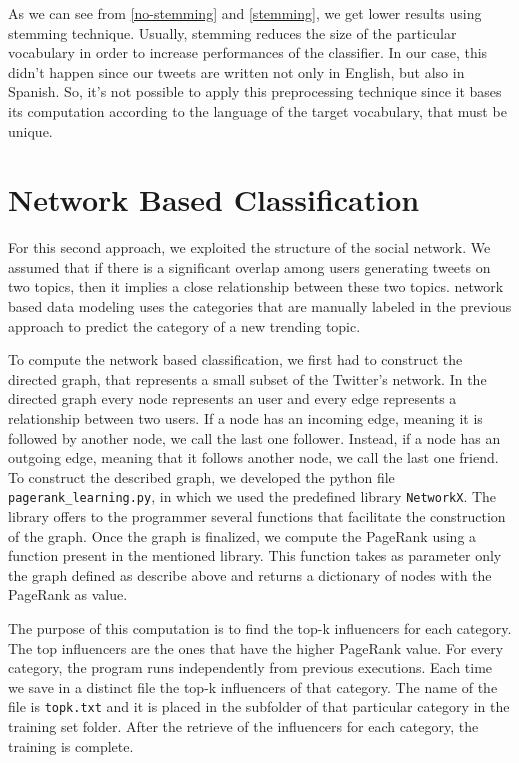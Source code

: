 \documentclass[journal,11pt]{vgtc}
\begin{document}
As we can see from \ref{no-stemming} and \ref{stemming}, we get lower results using stemming technique. Usually, stemming reduces the size of the particular vocabulary in order to increase performances of the classifier. In our case, this didn't happen since our tweets are written not only in English, but also in Spanish. So, it's not possible to apply this preprocessing technique since it bases its computation according to the language of the target vocabulary, that must be unique.

\newpage
\section{Network Based Classification}
For this second approach, we exploited the structure of the social network. We assumed that if there is a significant overlap among users
generating tweets on two topics, then it implies a close relationship between these two topics.
network based data modeling uses the categories that are manually labeled in the previous approach to predict
the category of a new trending topic.

To compute the network based classification, we first had to construct the directed graph, that represents a small
subset of the Twitter's network.
In the directed graph every node represents an user and every edge represents a relationship between two users.
If a node has an incoming edge, meaning it is followed by another node, we call the last one follower. Instead, if a node has an
outgoing edge, meaning that it follows another node, we call the last one friend.
To construct the described graph, we developed the python file \texttt{pagerank\_learning.py}, in which we used the predefined library \texttt{NetworkX}. The library offers to the programmer
several functions that facilitate the construction of the graph.
Once the graph is finalized, we compute the PageRank using a function present in the mentioned library.
This function takes as parameter only the graph defined as describe above and returns a dictionary of nodes
with the PageRank as value.

The purpose of this computation is to find the top-k influencers for each category. The top influencers
are the ones that have the higher PageRank value.
For every category, the program runs independently from previous executions. Each time we save in a
distinct file the top-k influencers of that category. The name of the file is
\texttt{topk.txt} and it is placed in the subfolder of that particular category in the training set folder.
After the retrieve of the influencers for each category, the training is complete.
\end{document}
